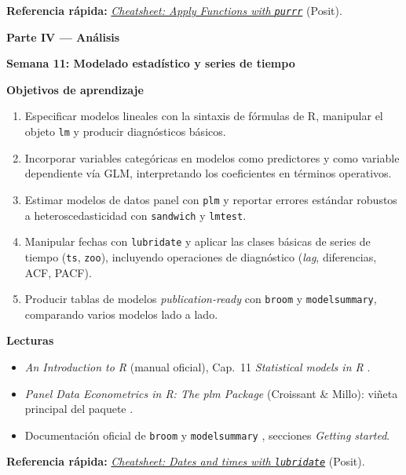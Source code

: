 \documentclass[11pt,letterpaper]{article}
\newcommand{\parteCurso}[1]{%
  \clearpage%
  \vspace*{0.5cm}%
  {\centering\color{main}\fontsize{26pt}{32pt}\selectfont\bfseries #1\par}%
  \vspace{0.8cm}%
}
\newcommand{\semana}[2]{%
  \bigskip%
  {\color{main}\Large\bfseries Semana #1: #2\par}%
  \smallskip%
}
\newcommand{\cheatsheet}[2]{%
  \href{https://rstudio.github.io/cheatsheets/#1.pdf}{\textit{Cheatsheet: #2}}%
}
\begin{document}
\medskip
\noindent\textbf{Referencia rápida:} \cheatsheet{purrr}{Apply Functions with \texttt{purrr}} (Posit).

\parteCurso{Parte IV --- Análisis}

\semana{11}{Modelado estadístico y series de tiempo}

\medskip
\noindent\textbf{Objetivos de aprendizaje}
\begin{enumerate}[leftmargin=*, itemsep=1pt]
    \item Especificar modelos lineales con la sintaxis de fórmulas de R, manipular el objeto \texttt{lm} y producir diagnósticos básicos.
    \item Incorporar variables categóricas en modelos como predictores y como variable dependiente vía GLM, interpretando los coeficientes en términos operativos.
    \item Estimar modelos de datos panel con \texttt{plm} y reportar errores estándar robustos a heteroscedasticidad con \texttt{sandwich} y \texttt{lmtest}.
    \item Manipular fechas con \texttt{lubridate} y aplicar las clases básicas de series de tiempo (\texttt{ts}, \texttt{zoo}), incluyendo operaciones de diagnóstico (\textit{lag}, diferencias, ACF, PACF).
    \item Producir tablas de modelos \textit{publication-ready} con \texttt{broom} y \texttt{modelsummary}, comparando varios modelos lado a lado.
\end{enumerate}

\medskip
\noindent\textbf{Lecturas}
\begin{itemize}[leftmargin=*, itemsep=1pt]
    \item \textit{An Introduction to R} (manual oficial), Cap.\ 11 \textit{Statistical models in R} \cite{rcoreteam-intro}.
    \item \textit{Panel Data Econometrics in R: The plm Package} (Croissant \& Millo): viñeta principal del paquete \cite{croissant-plm}.
    \item Documentación oficial de \texttt{broom} \cite{robinson-broom} y \texttt{modelsummary} \cite{arelbundock-modelsummary}, secciones \textit{Getting started}.
\end{itemize}

\medskip
\noindent\textbf{Referencia rápida:} \cheatsheet{lubridate}{Dates and times with \texttt{lubridate}} (Posit).
\end{document}
